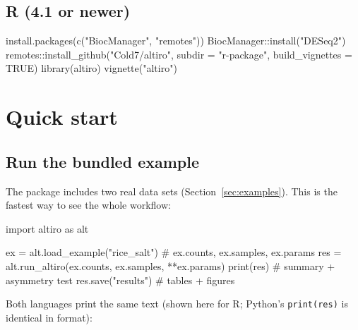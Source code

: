 \documentclass[11pt,a4paper]{article}
\newcommand{\code}[1]{\texttt{\color{navy!85!black}#1}}
\begin{document}
\subsection{R (4.1 or newer)}
\begin{rcode}
install.packages(c("BiocManager", "remotes"))
BiocManager::install("DESeq2")
remotes::install_github("Cold7/altiro", subdir = "r-package",
                        build_vignettes = TRUE)
library(altiro)
vignette("altiro")
\end{rcode}

\section{Quick start}

\subsection{Run the bundled example}

The package includes two real data sets (Section~\ref{sec:examples}). This is the fastest way to see
the whole workflow:

\begin{pycode}
import altiro as alt

ex = alt.load_example("rice_salt")            # ex.counts, ex.samples, ex.params
res = alt.run_altiro(ex.counts, ex.samples, **ex.params)
print(res)                                    # summary + asymmetry test
res.save("results")                           # tables + figures
\end{pycode}


Both languages print the same text (shown here for R; Python's \code{print(res)} is identical
in format):
\end{document}
